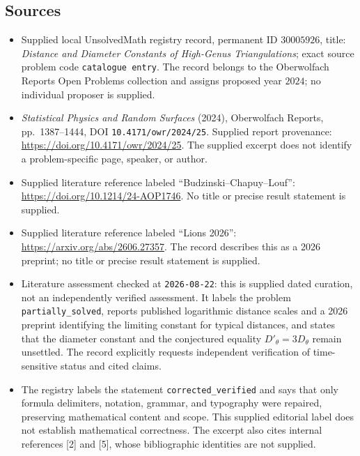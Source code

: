 \documentclass[11pt]{article}
\begin{document}
\subsection{Sources}
\begin{itemize}
\item Supplied local UnsolvedMath registry record, permanent ID \(30005926\), title: \emph{Distance and Diameter Constants of High-Genus Triangulations}; exact source problem code \texttt{catalogue entry}. The record belongs to the Oberwolfach Reports Open Problems collection and assigns proposed year \(2024\); no individual proposer is supplied.
\item \emph{Statistical Physics and Random Surfaces} (2024), Oberwolfach Reports, pp.~1387--1444, DOI \texttt{10.4171/owr/2024/25}. Supplied report provenance: \url{https://doi.org/10.4171/owr/2024/25}. The supplied excerpt does not identify a problem-specific page, speaker, or author.
\item Supplied literature reference labeled ``Budzinski--Chapuy--Louf'': \url{https://doi.org/10.1214/24-AOP1746}. No title or precise result statement is supplied.
\item Supplied literature reference labeled ``Lions 2026'': \url{https://arxiv.org/abs/2606.27357}. The record describes this as a 2026 preprint; no title or precise result statement is supplied.
\item Literature assessment checked at \texttt{2026-08-22}: this is supplied dated curation, not an independently verified assessment. It labels the problem \texttt{partially\_solved}, reports published logarithmic distance scales and a 2026 preprint identifying the limiting constant for typical distances, and states that the diameter constant and the conjectured equality \(D'_\theta=3D_\theta\) remain unsettled. The record explicitly requests independent verification of time-sensitive status and cited claims.
\item The registry labels the statement \texttt{corrected\_verified} and says that only formula delimiters, notation, grammar, and typography were repaired, preserving mathematical content and scope. This supplied editorial label does not establish mathematical correctness. The excerpt also cites internal references [2] and [5], whose bibliographic identities are not supplied.
\end{itemize}
\end{document}
